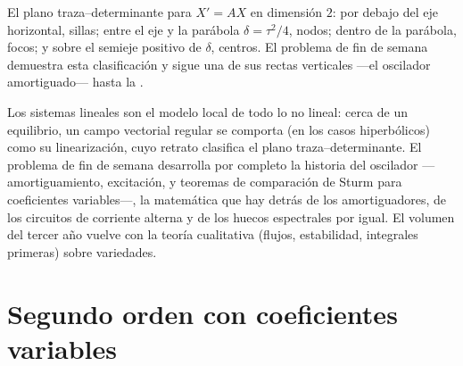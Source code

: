 \begin{omfigure}

{\small El plano traza--determinante para $X' = AX$ en dimensión $2$:
por debajo del eje horizontal, sillas; entre el eje y la parábola
$\delta = \tau^2/4$, nodos; dentro de la parábola, focos; y sobre el
semieje positivo de $\delta$, centros. El problema de fin de semana
demuestra esta clasificación y sigue una de sus rectas verticales
---el oscilador amortiguado--- hasta la .}
\end{omfigure}

\begin{remark}
Los sistemas lineales son el modelo local de todo lo no lineal: cerca
de un equilibrio, un campo vectorial regular se comporta (en los
casos hiperbólicos) como su linearización, cuyo retrato clasifica el
plano traza--determinante. El problema de fin de semana desarrolla
por completo la historia del oscilador ---amortiguamiento,
excitación,  y teoremas de comparación de Sturm para
coeficientes variables---, la matemática que hay detrás de los
amortiguadores, de los circuitos de corriente alterna y de los huecos
espectrales por igual. El volumen del tercer año vuelve con la teoría
cualitativa (flujos, estabilidad, integrales primeras) sobre
variedades.
\end{remark}

\section{Segundo orden con coeficientes variables}

